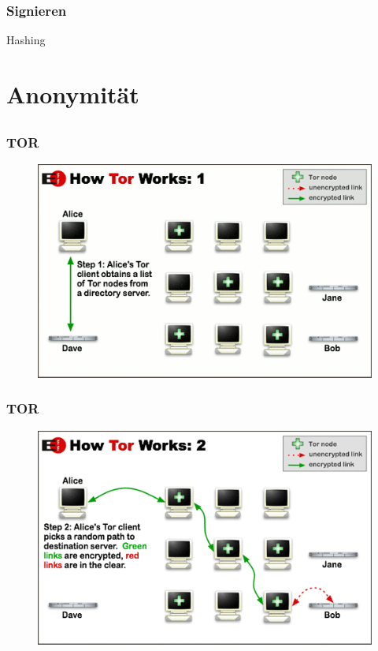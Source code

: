 \documentclass[12pt]{beamer}
\begin{document}
\begin{frame}
\frametitle{Signieren}
\begin{center}\Large
Hashing
\end{center}
\end{frame}

\section{Anonymität}
\subsection{}

\begin{frame}
  \frametitle{TOR}
  \begin{figure}
    \includegraphics[height=0.7\textheight]{img/tor-1.png}
  \end{figure}
\end{frame}

\begin{frame}
  \frametitle{TOR}
  \begin{figure}
    \includegraphics[height=0.7\textheight]{img/tor-2.png}
  \end{figure}
\end{frame}
\end{document}
